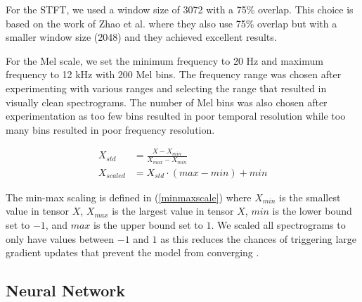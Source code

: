 \documentclass[a4paper, 10pt, conference]{ieeeconf}      %
\begin{document}
For the STFT, we used a window size of 3072 with a 75\% overlap. This choice is based on the work of Zhao et al. \cite{Zhao2019} where they also use 75\% overlap but with a smaller window size (2048) and they achieved excellent results. 

For the Mel scale, we set the minimum frequency to 20 Hz and maximum frequency to 12 kHz with 200 Mel bins. The frequency range was chosen after experimenting with various ranges and selecting the range that resulted in visually clean spectrograms. The number of Mel bins was also chosen after experimentation as too few bins resulted in poor temporal resolution while too many bins resulted in poor frequency resolution.

\begin{equation}
	\label{minmaxscale}
	\begin{aligned}
		X_{std} &= \frac{X - X_{min}}{X_{max} - X_{min}}\\
		X_{scaled} &= X_{std} \cdot (max - min) + min
	\end{aligned}
\end{equation}

The min-max scaling is defined in (\ref{minmaxscale}) where $X_{min}$ is the smallest value in tensor $X$, $X_{max}$ is the largest value in tensor $X$, $min$ is the lower bound set to $-1$, and $max$ is the upper bound set to $1$. We scaled all spectrograms to only have values between $-1$ and $1$ as this reduces the chances of triggering large gradient updates that prevent the model from converging \cite{Chollet2017}.


\subsection{Neural Network}

\end{document}
